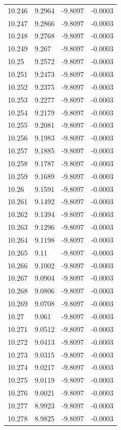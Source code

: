 \begin{tabular}{llll}
10.246 & 9.2964 & -9.8097 & -0.0003 \\
10.247 & 9.2866 & -9.8097 & -0.0003 \\
10.248 & 9.2768 & -9.8097 & -0.0003 \\
10.249 & 9.267 & -9.8097 & -0.0003 \\
10.25 & 9.2572 & -9.8097 & -0.0003 \\
10.251 & 9.2473 & -9.8097 & -0.0003 \\
10.252 & 9.2375 & -9.8097 & -0.0003 \\
10.253 & 9.2277 & -9.8097 & -0.0003 \\
10.254 & 9.2179 & -9.8097 & -0.0003 \\
10.255 & 9.2081 & -9.8097 & -0.0003 \\
10.256 & 9.1983 & -9.8097 & -0.0003 \\
10.257 & 9.1885 & -9.8097 & -0.0003 \\
10.258 & 9.1787 & -9.8097 & -0.0003 \\
10.259 & 9.1689 & -9.8097 & -0.0003 \\
10.26 & 9.1591 & -9.8097 & -0.0003 \\
10.261 & 9.1492 & -9.8097 & -0.0003 \\
10.262 & 9.1394 & -9.8097 & -0.0003 \\
10.263 & 9.1296 & -9.8097 & -0.0003 \\
10.264 & 9.1198 & -9.8097 & -0.0003 \\
10.265 & 9.11 & -9.8097 & -0.0003 \\
10.266 & 9.1002 & -9.8097 & -0.0003 \\
10.267 & 9.0904 & -9.8097 & -0.0003 \\
10.268 & 9.0806 & -9.8097 & -0.0003 \\
10.269 & 9.0708 & -9.8097 & -0.0003 \\
10.27 & 9.061 & -9.8097 & -0.0003 \\
10.271 & 9.0512 & -9.8097 & -0.0003 \\
10.272 & 9.0413 & -9.8097 & -0.0003 \\
10.273 & 9.0315 & -9.8097 & -0.0003 \\
10.274 & 9.0217 & -9.8097 & -0.0003 \\
10.275 & 9.0119 & -9.8097 & -0.0003 \\
10.276 & 9.0021 & -9.8097 & -0.0003 \\
10.277 & 8.9923 & -9.8097 & -0.0003 \\
10.278 & 8.9825 & -9.8097 & -0.0003 \\

\end{tabular}
